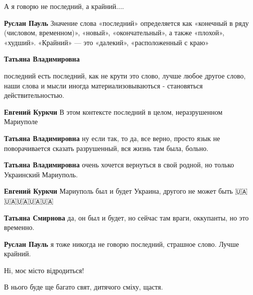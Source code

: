  
 
 
 
 

\qqSecCmt

\begin{itemize} %
А я говорю не последний, а крайний....

\begin{itemize} %
\textbf{Руслан Пауль} Значение слова «последний» определяется как «конечный в ряду (числовом, временном)», «новый», «окончательный», а также «плохой», «худший». «Крайний» — это «далекий», «расположенный с краю»

\textbf{Татьяна Владимировна} 

последний есть последний, как не крути это слово, лучше любое другое слово, наши
слова и мысли иногда материализовываються - становяться действительностью.

\textbf{Евгений Куркчи} В этом контексте последний в целом, неразрушенном Мариуполе

\textbf{Татьяна Владимировна} ну если так, то да, все верно, просто язык не поворачивается сказать разрушенный, вся жизнь там была, больно.

\textbf{Татьяна Владимировна} очень хочется вернуться в свой родной, но только Украинский Мариуполь.

\textbf{Евгений Куркчи} Мариуполь был и будет Украина, другого не может быть 🇺🇦🇺🇦🇺🇦🇺🇦🇺🇦

\textbf{Татьяна Смирнова} да, он был и будет, но сейчас там враги, оккупанты, но это временно.

\textbf{Руслан Пауль} я тоже никогда не говорю последний, страшное слово. Лучше крайний.

\end{itemize} %


Ні, моє місто відродиться!

В нього буде ще багато свят, дитячого сміху, щастя.


\end{itemize}
